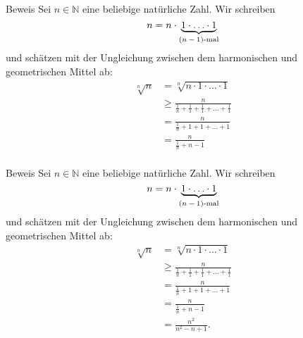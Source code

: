 \documentclass[10pt]{beamer}
\def\bN{\mathbb{N}}
\begin{document}
\begin{frame}{Beweis}
    Sei \( n \in \bN \) eine beliebige natürliche Zahl. Wir schreiben
    \[ 
        n = n \cdot \underbrace{1 \cdot \ldots \cdot 1}_{\text{\( \left( n - 1 \right) \)-mal}} 
    \] 
    und schätzen mit der Ungleichung zwischen dem harmonischen und geometrischen Mittel ab:
    \begin{align*}
        \sqrt[n]{n}
        & = \sqrt[n]{n \cdot 1 \cdot \ldots \cdot 1} \\
        & \geq \frac{n}{\frac{1}{n} + \frac{1}{1} + \frac{1}{1} + \ldots + \frac{1}{1}} \\
        & =	\frac{n}{\frac{1}{n} + 1 + 1 + \ldots + 1} \\
        & = \frac{n}{\frac{1}{n} + n - 1} \\
    \end{align*}
\end{frame}



\begin{frame}{Beweis}
    Sei \( n \in \bN \) eine beliebige natürliche Zahl. Wir schreiben
    \[ 
        n = n \cdot \underbrace{1 \cdot \ldots \cdot 1}_{\text{\( \left( n - 1 \right) \)-mal}} 
    \] 
    und schätzen mit der Ungleichung zwischen dem harmonischen und geometrischen Mittel ab:
    \begin{align*}
        \sqrt[n]{n}
        & = \sqrt[n]{n \cdot 1 \cdot \ldots \cdot 1} \\
        & \geq \frac{n}{\frac{1}{n} + \frac{1}{1} + \frac{1}{1} + \ldots + \frac{1}{1}} \\
        & =	\frac{n}{\frac{1}{n} + 1 + 1 + \ldots + 1} \\
        & = \frac{n}{\frac{1}{n} + n - 1} \\
		& = \frac{n^{2}}{n^{2} - n + 1}.
    \end{align*}
\end{frame}
\end{document}
